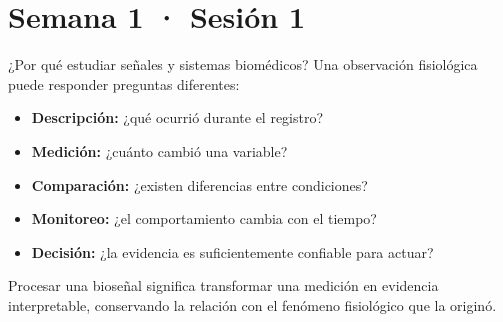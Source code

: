 \documentclass[
  ignorenonframetext,
  aspectratio=169,
  spanish,
  professionalfonts]{beamer}
\providecommand{\tightlist}{%
  \setlength{\itemsep}{0pt}\setlength{\parskip}{0pt}}
\begin{document}
\section{Semana 1 · Sesión 1}\label{semana-1-sesiuxf3n-1}

\begin{frame}{¿Por qué estudiar señales y sistemas biomédicos?}
\protect{}\label{por-quuxe9-estudiar-seuxf1ales-y-sistemas-biomuxe9dicos}
Una observación fisiológica puede responder preguntas diferentes:

\begin{itemize}
\tightlist
\item
  \textbf{Descripción:} ¿qué ocurrió durante el registro?
\item
  \textbf{Medición:} ¿cuánto cambió una variable?
\item
  \textbf{Comparación:} ¿existen diferencias entre condiciones?
\item
  \textbf{Monitoreo:} ¿el comportamiento cambia con el tiempo?
\item
  \textbf{Decisión:} ¿la evidencia es suficientemente confiable para
  actuar?
\end{itemize}

\begin{tcolorbox}[enhanced jigsaw, arc=.35mm, bottomrule=.15mm, bottomtitle=1mm, breakable, colback=white, colbacktitle=quarto-callout-important-color!10!white, colframe=quarto-callout-important-color-frame, coltitle=black, left=2mm, leftrule=.75mm, opacityback=0, opacitybacktitle=0.6, rightrule=.15mm, title={Punto central}, titlerule=0mm, toprule=.15mm, toptitle=1mm]

Procesar una bioseñal significa transformar una medición en evidencia
interpretable, conservando la relación con el fenómeno fisiológico que
la originó.

\end{tcolorbox}
\end{frame}
\end{document}
